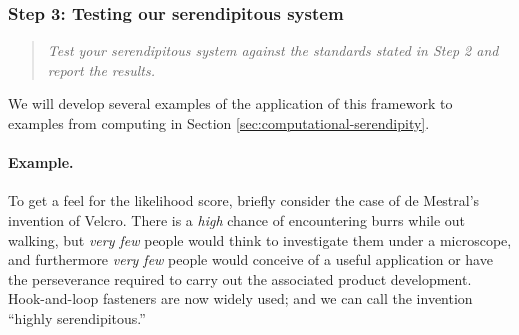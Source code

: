 \subsubsection*{Step 3: Testing our serendipitous system}

\begin{quote} {\em Test your serendipitous system against the standards stated in Step 2 and report the
results.}\end{quote}

We will develop several examples of the application of this framework
to examples from computing in Section
\ref{sec:computational-serendipity}.  

\paragraph{Example.}
To get a feel for the likelihood score, briefly consider the case of
de Mestral's invention of Velcro\texttrademark.  There is a \emph{high}
chance of encountering burrs while out walking, but \emph{very few}
people would think to investigate them under a microscope, and
furthermore \emph{very few} people would conceive of a useful
application or have the perseverance required to carry out the
associated product development.  Hook-and-loop fasteners are now widely
used; and we can call the invention ``highly serendipitous.''

